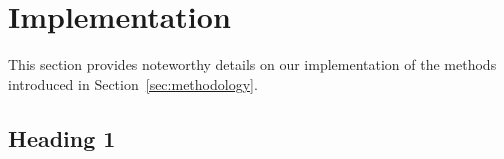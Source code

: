 \section{Implementation}
\label{sec:impl}

This section provides noteworthy details on our implementation of the methods 
introduced in Section~\ref{sec:methodology}.\vertbreak

\subsection{Heading 1}
\label{subsec:heading-1-impl}


